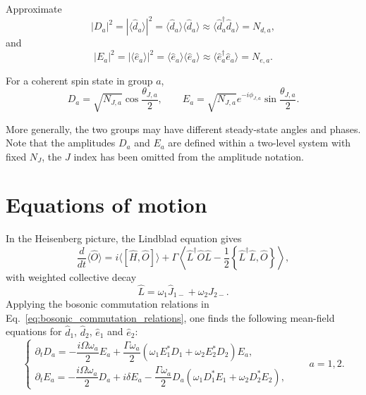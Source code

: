 \documentclass[11pt]{article}
\begin{document}
Approximate
\begin{equation}
|D_a|^2 
=
|\langle \hat{d}_a\rangle|^2 = \langle \hat{d}_a\rangle \langle \hat{d}_a\rangle 
\approx
\langle \hat{d}_a^{\dagger}\hat{d}_a\rangle
=
N_{d,a},
\end{equation}
and
\begin{equation}
|E_a|^2
=
|\langle \hat{e}_a\rangle|^2 = \langle \hat{e}_a\rangle \langle \hat{e}_a\rangle
\approx
\langle \hat{e}_a^{\dagger}\hat{e}_a\rangle
=
N_{e,a}.
\end{equation}

For a coherent spin state in group \(a\),
\begin{equation}
D_a
=
\sqrt{N_{J,a}}\cos\frac{\theta_{J,a}}{2},
\qquad
E_a
=
\sqrt{N_{J,a}}e^{-i\phi_{J,a}}\sin\frac{\theta_{J,a}}{2}.
\end{equation}

More generally, the two groups may have different steady-state angles and phases. Note that the amplitudes $D_a$ and $E_a$ are defined within a two-level system with fixed $N_J$, the $J$ index has been omitted from the amplitude notation.

\section{Equations of motion}

In the Heisenberg picture, the Lindblad equation gives
\begin{equation}
\frac{d}{dt}\langle \hat{O}\rangle
=
i\langle [\hat{H},\hat{O}]\rangle
+
\Gamma
\left\langle
\hat{L}^{\dagger}\hat{O}\hat{L}
-
\frac{1}{2}
\left\{
\hat{L}^{\dagger}\hat{L},\hat{O}
\right\}
\right\rangle,
\end{equation}
with weighted collective decay
\begin{equation}
\hat{L}
=
\omega_1 \hat{J}_{1-}
+
\omega_2 \hat{J}_{2-}.
\end{equation}
Applying the bosonic commutation relations in Eq.~\ref{eq:bosonic_commutation_relations}, one finds the following mean-field equations for $\hat d_1$, $\hat d_2$, $\hat e_1$ and $\hat e_2$:
\begin{equation}
\begin{cases}
\partial_t D_a
=
-\dfrac{i\Omega\omega_a}{2}E_a
+
\dfrac{\Gamma \omega_a }{2}
(
\omega_1 E_1^{*}D_1
+
\omega_2 E_2^{*}D_2
)
E_a,
\\[2mm]
\partial_t E_a
=
-\dfrac{i\Omega\omega_a}{2}D_a
+
i\delta E_a
-
\dfrac{\Gamma \omega_a }{2}
D_a
(
\omega_1 D_1^{*}E_1
+
\omega_2 D_2^{*}E_2
),
\end{cases}
\qquad
a=1,2.
\end{equation}
\end{document}
